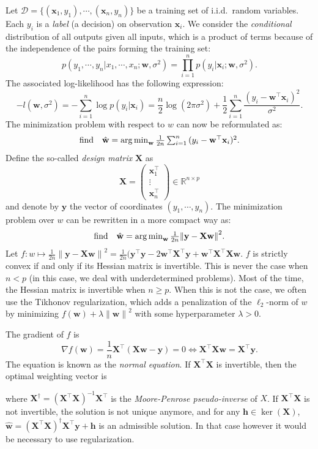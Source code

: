 \documentclass[12pt]{report}	%
\def\ts{\top}
\def\XX{\mathbf{X}}
\def\wb{\mathbf{w}}
\def\xb{\mathbf{x}}
\def\yb{\mathbf{y}}
\def\hb{\mathbf{h}}
\begin{document}
Let $\mathcal{D}=\lbrace (\xb_1,y_1),\cdots ,(\xb_n,y_n)\rbrace$ be a training set of i.i.d.\ random variables. Each $y_i$ is a \emph{label} (a decision) on observation $\xb_i$. We consider the \emph{conditional} distribution of all outputs given all inputs, which is a product of terms because of the independence of the pairs forming the training set:
$$
p(y_1, \cdots , y_n | x_1, \cdots, x_n ; {\wb},\sigma^2) = \prod_{i=1}^n p(y_i | \xb_i ; {\wb},\sigma^2).
$$
The associated log-likelihood has the following expression:
$$
-l({\wb},\sigma^2) = -\sum_{i=1}^n{\log p(y_i|\xb_i)} = \frac{n}{2}\log(2\pi\sigma^2)+\frac{1}{2}\sum_{i=1}^n{\frac{(y_i-{\wb}^{\ts}\xb_i)^2}{\sigma^2}}.
$$
The minimization problem with respect to $w$ can now be reformulated as:
$$
\begin{array}{ll}
\mathrm{find} & \hat{\wb} = \argmin_{\wb} \frac{1}{2n}\sum_{i=1}^n{(y_i-{\wb}^{\ts}\xb_i)^2}.
\end{array}
$$
Define the so-called \emph{design matrix} $\XX$ as
$$
\XX = \begin{pmatrix}
\xb_1^{\ts} \\ \vdots \\ \xb_n^{\ts}
\end{pmatrix} \in \mathbb{R}^{n\times p}
$$
and denote by $\yb$ the vector of coordinates $(y_1,\cdots ,y_n)$. The minimization problem over $w$ can be rewritten in a more compact way as:
$$
\begin{array}{ll}
\mathrm{find} & \hat{\wb} = \argmin_{\wb} \frac{1}{2n}{\lVert \yb - \XX\wb \rVert}^2.
\end{array}
$$
Let $f:w\mapsto\frac{1}{2n}{\lVert \yb - \XX\wb \rVert}^2 = \frac{1}{2n}(\yb^{\ts}\yb-2{\wb}^{\ts}\XX^{\ts}\yb +{\wb}^{\ts}\XX^{\ts}\XX\wb$. $f$ is strictly convex if and only if its Hessian matrix is invertible. This is never the case when $n<p$ (in this case, we deal with underdetermined problems). Most of the time, the Hessian matrix is invertible when $n \geq p$. When this is not the case, we often use the Tikhonov regularization, which adds a penalization of the $\ell_2$-norm of $w$ by minimizing $f({\wb})+\lambda{\lVert \wb \rVert}^2$ with some hyperparameter $\lambda>0$.

The gradient of $f$ is
$$
\nabla f({\wb}) = \frac{1}{n}\XX^{\ts}(\XX\wb-\yb ) = 0 \iff \XX^{\ts}\XX\wb = \XX^{\ts}\yb .
$$
The equation \fbox{$\XX^{\ts}\XX\wb = \XX^{\ts}\yb $} is known as the \emph{normal equation}. If $\XX^{\ts}\XX$ is invertible, then the optimal weighting vector is
\begin{center}
\fbox{$\hat{\wb} = (\XX^{\ts}\XX)^{-1}\XX^{\ts}\yb  = \XX^\dagger \yb$}
\end{center}
where $\XX^\dagger = (\XX^{\ts}\XX)^{-1}\XX^{\ts}$ is the \emph{Moore-Penrose pseudo-inverse} of $X$. If $\XX^{\ts}\XX$ is not invertible, the solution is not unique anymore, and for any $\hb\in\ker(\XX)$, $\hat{\wb} = (\XX^{\ts}\XX)^\dagger \XX^{\ts}\yb +\hb$ is an admissible solution. In that case however it would be necessary to use regularization.
\end{document}
